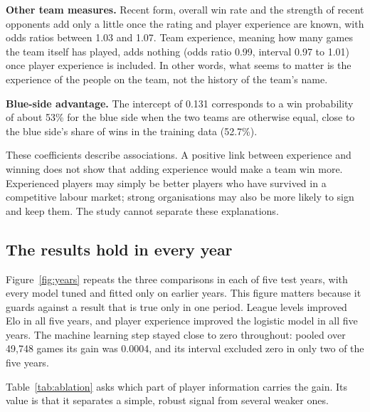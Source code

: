 \documentclass[12pt,a4paper]{article}
\begin{document}
\textbf{Other team measures.} Recent form, overall win rate and the strength of recent opponents add only a little once the rating and player experience are known, with odds ratios between 1.03 and 1.07. Team experience, meaning how many games the team itself has played, adds nothing (odds ratio 0.99, interval 0.97 to 1.01) once player experience is included. In other words, what seems to matter is the experience of the people on the team, not the history of the team's name.

\textbf{Blue-side advantage.} The intercept of 0.131 corresponds to a win probability of about 53\% for the blue side when the two teams are otherwise equal, close to the blue side's share of wins in the training data (52.7\%).

These coefficients describe associations. A positive link between experience and winning does not show that adding experience would make a team win more. Experienced players may simply be better players who have survived in a competitive labour market; strong organisations may also be more likely to sign and keep them. The study cannot separate these explanations.

\subsection{The results hold in every year}

Figure~\ref{fig:years} repeats the three comparisons in each of five test years, with every model tuned and fitted only on earlier years. This figure matters because it guards against a result that is true only in one period. League levels improved Elo in all five years, and player experience improved the logistic model in all five years. The machine learning step stayed close to zero throughout: pooled over 49,748 games its gain was 0.0004, and its interval excluded zero in only two of the five years.



Table~\ref{tab:ablation} asks which part of player information carries the gain. Its value is that it separates a simple, robust signal from several weaker ones.
\end{document}
